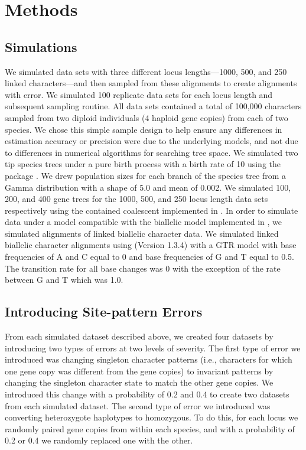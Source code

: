 

\section{Methods}
\subsection{Simulations}
We simulated data sets with three different locus lengths—1000, 500, and 250 
linked characters—and then sampled from these alignments to create alignments 
with  error. We simulated 100 replicate data sets for each locus length and 
subsequent sampling routine. All data sets contained a total of 100,000 
characters sampled from two diploid individuals (4 haploid gene copies) from each 
of two species. We chose this simple sample design to help ensure any 
differences in estimation accuracy or precision were due to the underlying 
models, and not due to differences in numerical algorithms for searching tree 
space.  We simulated two tip species trees under a pure birth process with a 
birth rate of 10 using the \python package
\dendropy
\citep[Version 4.40; dev branch commit eb69003;][]{Dendropy}.  
We drew population sizes for each branch of the species tree from a Gamma 
distribution with a shape of 5.0 and mean of 0.002. We simulated 100, 200, and 
400 gene trees for the 1000, 500, and 250 locus length data sets respectively 
using the contained coalescent implemented in \dendropy. In order to 
simulate data under a model compatible with the biallelic model implemented in 
\ecoevolity, we simulated alignments of linked biallelic character data. 
We simulated linked biallelic character alignments using
\seqgen (Version 1.3.4)
\citep{@rambautSeqGenApplicationMonte1997}
with a GTR model with base frequencies of A and C equal to 0 and base 
frequencies of G and T equal to 0.5. The transition rate for all base changes was 
0 with the exception of the rate between G and T which was 1.0. 

\subsection{Introducing Site-pattern Errors}
From each simulated dataset described above, we created four datasets by 
introducing two types of errors at two levels of severity. The first type of 
error we introduced was changing singleton character patterns (i.e., characters 
for which one gene copy was different from the gene copies) to invariant 
patterns by changing the singleton character state to match the other gene 
copies. We introduced this change with a probability of 0.2 and 0.4 to create 
two datasets from each simulated dataset. The second type of error we introduced 
was converting heterozygote haplotypes to homozygous. To do this, for each locus 
we randomly paired gene copies from within each species, and with a probability 
of 0.2 or 0.4 we randomly replaced one with the other. 

